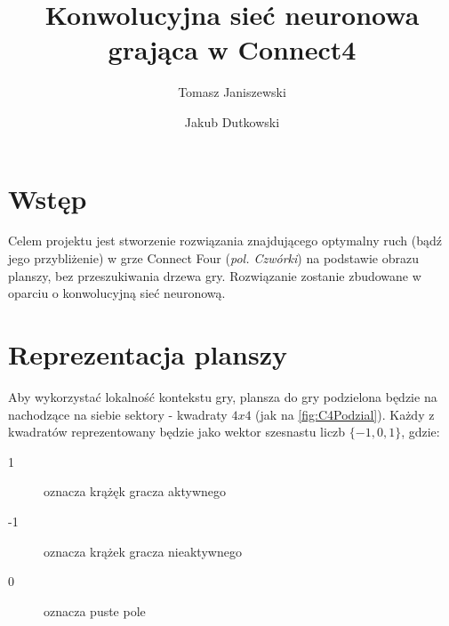 \documentclass{llncs}
\begin{document}
\title{Konwolucyjna sieć neuronowa grająca w Connect4}
%
%
\author{Tomasz Janiszewski \and Jakub Dutkowski}
%
%


\maketitle              %

%
\section{Wstęp}
Celem projektu jest stworzenie rozwiązania znajdującego optymalny ruch (bądź jego przybliżenie) w grze Connect Four (\emph{pol. Czwórki}) \cite{connect4:wiki} na podstawie obrazu planszy, bez przeszukiwania drzewa gry. 
Rozwiązanie zostanie zbudowane w oparciu o konwolucyjną sieć neuronową.

\section{Reprezentacja planszy}
Aby wykorzystać lokalność kontekstu gry, plansza do gry podzielona będzie na nachodzące na siebie sektory - kwadraty $4x4$ (jak na \autoref{fig:C4Podzial}). 
Każdy z kwadratów reprezentowany będzie jako wektor szesnastu liczb $\{-1, 0, 1\}$, gdzie:
\begin{description}
	\item[1] oznacza krążęk gracza aktywnego
	\item[-1] oznacza krążek gracza nieaktywnego
	\item[0] oznacza puste pole
\end{description} 
\end{document}
